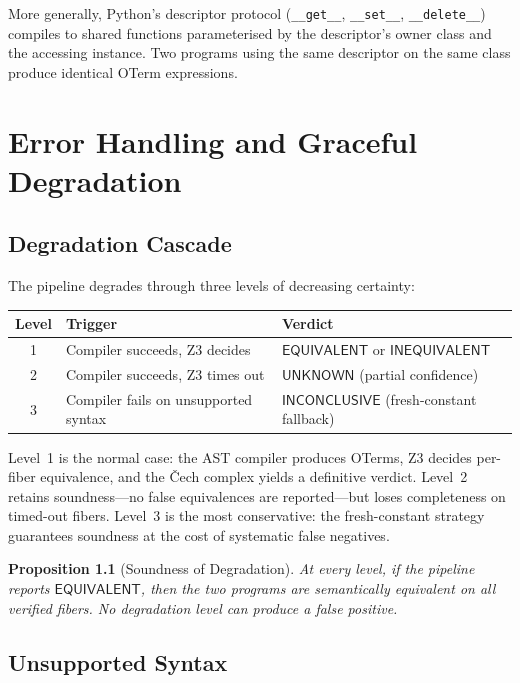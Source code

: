 \documentclass[11pt,a4paper]{report}
\theoremstyle{definition}
\theoremstyle{plain}
\newtheorem{proposition}[definition]{Proposition}
\begin{document}
More generally, Python's descriptor protocol (\texttt{\_\_get\_\_},
\texttt{\_\_set\_\_}, \texttt{\_\_delete\_\_}) compiles to shared
functions parameterised by the descriptor's owner class and the
accessing instance.  Two programs using the same descriptor on the
same class produce identical OTerm expressions.


\chapter{Error Handling and Graceful Degradation}
\label{ch:errors}

\section{Degradation Cascade}

The pipeline degrades through three levels of decreasing certainty:

\begin{center}
\begin{tabular}{c l l}
  \textbf{Level} & \textbf{Trigger} & \textbf{Verdict} \\
  \hline
  1 & Compiler succeeds, Z3 decides &
      $\mathsf{EQUIVALENT}$ or $\mathsf{INEQUIVALENT}$ \\
  2 & Compiler succeeds, Z3 times out &
      $\mathsf{UNKNOWN}$ (partial confidence) \\
  3 & Compiler fails on unsupported syntax &
      $\mathsf{INCONCLUSIVE}$ (fresh-constant fallback) \\
\end{tabular}
\end{center}

\noindent
Level~1 is the normal case: the AST compiler produces OTerms, Z3
decides per-fiber equivalence, and the \v{C}ech complex yields a
definitive verdict.  Level~2 retains soundness---no false
equivalences are reported---but loses completeness on timed-out
fibers.  Level~3 is the most conservative: the fresh-constant
strategy guarantees soundness at the cost of systematic false
negatives.

\begin{proposition}[Soundness of Degradation]
At every level, if the pipeline reports $\mathsf{EQUIVALENT}$,
then the two programs are semantically equivalent on all verified
fibers.  No degradation level can produce a false positive.
\end{proposition}

\section{Unsupported Syntax}
\end{document}
